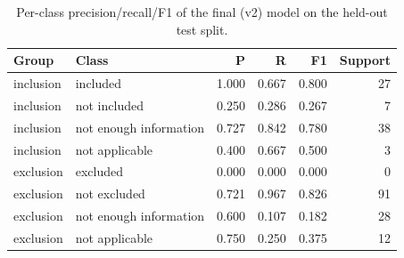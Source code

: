\begin{table}[t]
\centering
\caption{Per-class precision/recall/F1 of the final (v2) model on the held-out test split.}
\label{tab:perclass}
\footnotesize
\begin{tabular}{llrrrr}
\toprule
Group & Class & P & R & F1 & Support \\
\midrule
inclusion & included & 1.000 & 0.667 & 0.800 & 27 \\
inclusion & not included & 0.250 & 0.286 & 0.267 & 7 \\
inclusion & not enough information & 0.727 & 0.842 & 0.780 & 38 \\
inclusion & not applicable & 0.400 & 0.667 & 0.500 & 3 \\
exclusion & excluded & 0.000 & 0.000 & 0.000 & 0 \\
exclusion & not excluded & 0.721 & 0.967 & 0.826 & 91 \\
exclusion & not enough information & 0.600 & 0.107 & 0.182 & 28 \\
exclusion & not applicable & 0.750 & 0.250 & 0.375 & 12 \\
\bottomrule
\end{tabular}
\end{table}
